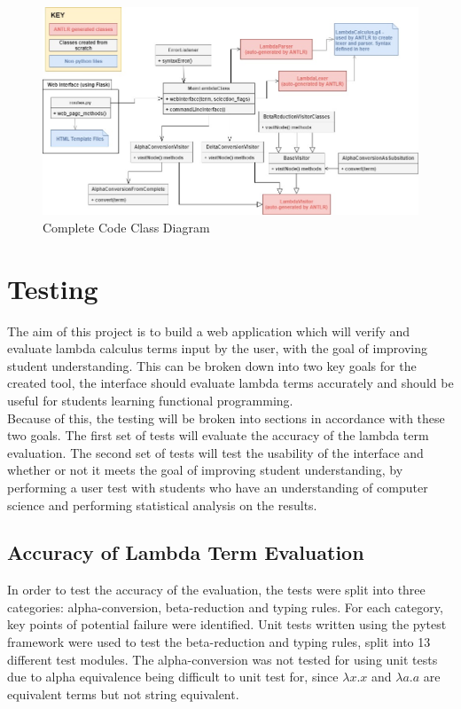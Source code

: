 \documentclass[a4paper,11pt]{report}
\begin{document}
\begin{figure}[p]
	\includegraphics[scale=0.4]{images/class_diagram}
	\centering
	\caption{Complete Code Class Diagram}
	\label{class_diagram}
\end{figure}

\chapter{Testing}
The aim of this project is to build a web application which will verify and evaluate lambda calculus terms input by the user, with the goal of improving student understanding. This can be broken down into two key goals for the created tool, the interface should evaluate lambda terms accurately and should be useful for students learning functional programming.\\

Because of this, the testing will be broken into sections in accordance with these two goals. The first set of tests will evaluate the accuracy of the lambda term evaluation. The second set of tests will test the usability of the interface and whether or not it meets the goal of improving student understanding, by performing a user test with students who have an understanding of computer science and performing statistical analysis on the results.

\section{Accuracy of Lambda Term Evaluation}
\label{Accuracy of Lambda Term Evaluation}
In order to test the accuracy of the evaluation, the tests were split into three categories: alpha-conversion, beta-reduction and typing rules. For each category, key points of potential failure were identified. Unit tests written using the pytest framework were used to test the beta-reduction and typing rules, split into 13 different test modules. The alpha-conversion was not tested for using unit tests due to alpha equivalence being difficult to unit test for, since $\lambda x.x$ and $\lambda a.a$ are equivalent terms but not string equivalent.\\
\end{document}
